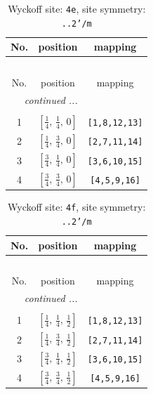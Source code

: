 \documentclass[fleqn,8pt]{jsarticle}
\begin{document}
\begin{longtable}{ccc}
\caption{Wyckoff site: {\tt 4e}, site symmetry: {\tt ..2'/m}}
 \\
 \hline \hline
No. & position & mapping \\ \hline \endfirsthead

\multicolumn{2}{l}{\tablename\ \thetable{}} \\
 \hline \hline
No. & position & mapping \\ \hline \endhead

 \hline \hline
\multicolumn{2}{r}{\footnotesize\it continued ...} \\ \endfoot

 \hline \hline
\multicolumn{2}{r}{} \\ \endlastfoot

1 & $\left[ \frac{1}{4},\, \frac{1}{4},\, 0 \right]$ & {\tt [1,8,12,13]} \\ \hline
2 & $\left[ \frac{1}{4},\, \frac{3}{4},\, 0 \right]$ & {\tt [2,7,11,14]} \\ \hline
3 & $\left[ \frac{3}{4},\, \frac{1}{4},\, 0 \right]$ & {\tt [3,6,10,15]} \\ \hline
4 & $\left[ \frac{3}{4},\, \frac{3}{4},\, 0 \right]$ & {\tt [4,5,9,16]} \\
\end{longtable}
\renewcommand{\arraystretch}{1.2}
\begin{longtable}{ccc}
\caption{Wyckoff site: {\tt 4f}, site symmetry: {\tt ..2'/m}}
 \\
 \hline \hline
No. & position & mapping \\ \hline \endfirsthead

\multicolumn{2}{l}{\tablename\ \thetable{}} \\
 \hline \hline
No. & position & mapping \\ \hline \endhead

 \hline \hline
\multicolumn{2}{r}{\footnotesize\it continued ...} \\ \endfoot

 \hline \hline
\multicolumn{2}{r}{} \\ \endlastfoot

1 & $\left[ \frac{1}{4},\, \frac{1}{4},\, \frac{1}{2} \right]$ & {\tt [1,8,12,13]} \\ \hline
2 & $\left[ \frac{1}{4},\, \frac{3}{4},\, \frac{1}{2} \right]$ & {\tt [2,7,11,14]} \\ \hline
3 & $\left[ \frac{3}{4},\, \frac{1}{4},\, \frac{1}{2} \right]$ & {\tt [3,6,10,15]} \\ \hline
4 & $\left[ \frac{3}{4},\, \frac{3}{4},\, \frac{1}{2} \right]$ & {\tt [4,5,9,16]} \\
\end{longtable}
\end{document}
